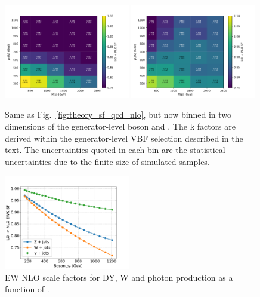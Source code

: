 \begin{figure}[ht!]
    \begin{center}
        \includegraphics[width=0.49\textwidth]{fig/theory/qcdnlo/2d_dy_gen_vpt_vbf_dress.pdf}
        \includegraphics[width=0.49\textwidth]{fig/theory/qcdnlo/2d_wjet_gen_vpt_vbf_dress.pdf} \\
        \caption{
            Same as Fig.~\ref{fig:theory_sf_qcd_nlo}, but now binned in two dimensions of the generator-level boson \pt and \mjj.
            The k factors are derived within the generator-level VBF selection described in the text.
            The uncertainties quoted in each bin are the statistical uncertainties due to the finite size of simulated samples.
          }
      \label{fig:theory_sf_qcd_nlo_2d}
    \end{center}
  \end{figure}
\begin{figure}[ht!]
    \begin{center}
        \includegraphics[width=0.49\textwidth]{fig/theory/ewnlo/nlo_ewk.pdf}
        \caption{
            EW NLO scale factors for DY, W and photon production as a function of \ptv.
          }
      \label{fig:theory_sf_ew_nlo}
    \end{center}
  \end{figure}

